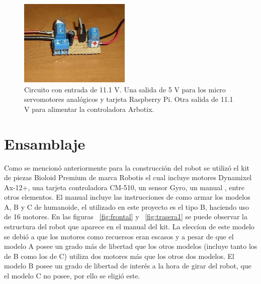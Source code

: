 \begin{figure}[hbtp]
\centering
\includegraphics[scale=0.5]{imagenes/circuito.jpg}
\caption{Circuito con entrada de 11.1 V. Una salida de 5 V para los micro servomotores anal\'ogicos y tarjeta Raspberry Pi. Otra salida de 11.1 V para alimentar la controladora Arbotix.}
\label{fig:circuito}
\end{figure}


\section{Ensamblaje}\label{subsection:construccion}

Como se mencionó anteriormente para la construcción del robot se utilizó el kit de piezas Bioloid Premium de marca Robotis el cual incluye motores Dynamixel Ax-12+, una tarjeta controladora CM-510, un sensor Gyro, un manual \cite{manualRobot}, entre otros elementos. El manual incluye las instrucciones de como armar los modelos A, B y C de humanoide, el utilizado en este proyecto es el tipo B, haciendo uso de 16 motores. En las figuras ~\ref{fig:frontal} y ~\ref{fig:trasera1}  se puede observar la estructura del robot que aparece en el manual del kit. La elecc\'ion de este modelo se debi\'o a que los motores como recuersos eran escasos y a pesar de que el modelo A posee un grado más de libertad que los otros modelos (incluye tanto los de B como los de C) utiliza dos motores más que los otros dos modelos. El modelo B posee un grado de libertad de interés a la hora de girar del robot, que el modelo C no posee, por ello se eligi\'o este.

